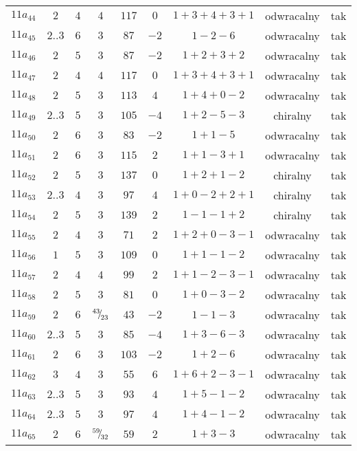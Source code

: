 \begin{longtable}{ccccccccc}
$11a_{44}$ & $2$ & $4$ & $4$ & $117$ & $0$ & $1+3+4+3+1$ & odwracalny & tak \\
$11a_{45}$ & $2..3$ & $6$ & $3$ & $87$ & $-2$ & $1-2-6$ & odwracalny & tak \\
$11a_{46}$ & $2$ & $5$ & $3$ & $87$ & $-2$ & $1+2+3+2$ & odwracalny & tak \\
$11a_{47}$ & $2$ & $4$ & $4$ & $117$ & $0$ & $1+3+4+3+1$ & odwracalny & tak \\
$11a_{48}$ & $2$ & $5$ & $3$ & $113$ & $4$ & $1+4+0-2$ & odwracalny & tak \\
$11a_{49}$ & $2..3$ & $5$ & $3$ & $105$ & $-4$ & $1+2-5-3$ & chiralny & tak \\
$11a_{50}$ & $2$ & $6$ & $3$ & $83$ & $-2$ & $1+1-5$ & odwracalny & tak \\
$11a_{51}$ & $2$ & $6$ & $3$ & $115$ & $2$ & $1+1-3+1$ & odwracalny & tak \\
$11a_{52}$ & $2$ & $5$ & $3$ & $137$ & $0$ & $1+2+1-2$ & chiralny & tak \\
$11a_{53}$ & $2..3$ & $4$ & $3$ & $97$ & $4$ & $1+0-2+2+1$ & chiralny & tak \\
$11a_{54}$ & $2$ & $5$ & $3$ & $139$ & $2$ & $1-1-1+2$ & chiralny & tak \\
$11a_{55}$ & $2$ & $4$ & $3$ & $71$ & $2$ & $1+2+0-3-1$ & odwracalny & tak \\
$11a_{56}$ & $1$ & $5$ & $3$ & $109$ & $0$ & $1+1-1-2$ & odwracalny & tak \\
$11a_{57}$ & $2$ & $4$ & $4$ & $99$ & $2$ & $1+1-2-3-1$ & odwracalny & tak \\
$11a_{58}$ & $2$ & $5$ & $3$ & $81$ & $0$ & $1+0-3-2$ & odwracalny & tak \\
$11a_{59}$ & $2$ & $6$ & ${}^{43}{\mskip -5mu/\mskip -3mu}_{23}$ & $43$ & $-2$ & $1-1-3$ & odwracalny & tak \\
$11a_{60}$ & $2..3$ & $5$ & $3$ & $85$ & $-4$ & $1+3-6-3$ & odwracalny & tak \\
$11a_{61}$ & $2$ & $6$ & $3$ & $103$ & $-2$ & $1+2-6$ & odwracalny & tak \\
$11a_{62}$ & $3$ & $4$ & $3$ & $55$ & $6$ & $1+6+2-3-1$ & odwracalny & tak \\
$11a_{63}$ & $2..3$ & $5$ & $3$ & $93$ & $4$ & $1+5-1-2$ & odwracalny & tak \\
$11a_{64}$ & $2..3$ & $5$ & $3$ & $97$ & $4$ & $1+4-1-2$ & odwracalny & tak \\
$11a_{65}$ & $2$ & $6$ & ${}^{59}{\mskip -5mu/\mskip -3mu}_{32}$ & $59$ & $2$ & $1+3-3$ & odwracalny & tak \\

\end{longtable}
